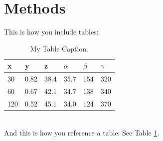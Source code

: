 \documentclass{article}
\begin{document}
\section{Methods}
This is how you include tables:
\begin{table}[htb]
	\begin{center}
		\caption{My Table Caption.}
		\label{tab: example} %
		\begin{tabular}{|l|l|l|l|l|l|}
			\hline
			x & y & z & $\alpha$
			& $\beta$
			& $\gamma$\\\hline
			30  & 0.82 & 38.4 & 35.7 & 154 & 320 \\
			60  & 0.67 & 42.1 & 34.7 & 138 & 340 \\
			120 & 0.52 & 45.1 & 34.0 & 124 & 370 \\
			\hline
		\end{tabular}
	\end{center}
\end{table}\\
And this is how you reference a table: See Table \ref{tab: example}.\\
\end{document}
